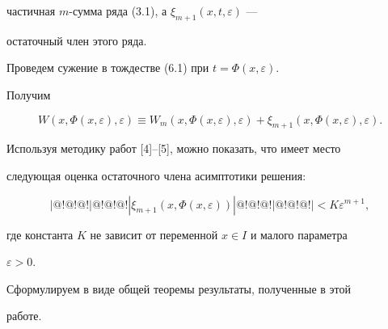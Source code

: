 частичная $m$-сумма ряда (3.1), а $\xi_{m+1}(x,t,\varepsilon)$ ---  


остаточный член этого ряда. 


 


Проведем сужение в тождестве (6.1) при $t=\Phi(x,\varepsilon)$. 


Получим 


$$ 


W(x,\Phi(x,\varepsilon),\varepsilon)\equiv 


W_m(x,\Phi(x,\varepsilon),\varepsilon)+\xi_{m+1} 


(x,\Phi(x,\varepsilon),\varepsilon). 


$$ 


 


Используя методику работ [4]--[5], можно показать, что имеет место 


следующая оценка остаточного члена асимптотики решения: 


\begin{equation} 


|@!@!@!|@!@!@!|\xi_{m+1}


(x,\Phi(x,\varepsilon))|@!@!@!|@!@!@!|<K\varepsilon^{m+1}, 


\end{equation} 


где константа $K$ не зависит от переменной $x\in I$ и малого параметра 


$\varepsilon>0$. 


 


Сформулируем в виде общей теоремы результаты, полученные в этой 


работе. 


 


